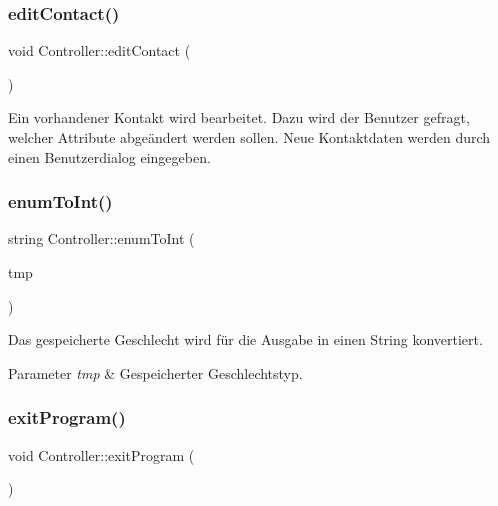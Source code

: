 \subsubsection{\texorpdfstring{edit\+Contact()}{editContact()}}
{\footnotesize\ttfamily void Controller\+::edit\+Contact (\begin{DoxyParamCaption}{ }\end{DoxyParamCaption})}



Ein vorhandener Kontakt wird bearbeitet. Dazu wird der Benutzer gefragt, welcher Attribute abgeändert werden sollen. Neue Kontaktdaten werden durch einen Benutzerdialog eingegeben.

\mbox{\label{classContactManager_1_1Controller_a6989880aa8c549f03067cb7d8d1be7a6}} 
\subsubsection{\texorpdfstring{enum\+To\+Int()}{enumToInt()}}
{\footnotesize\ttfamily string Controller\+::enum\+To\+Int (\begin{DoxyParamCaption}\item[{Gender\+Type}]{tmp }\end{DoxyParamCaption})\hspace{0.3cm}{\ttfamily [static]}}



Das gespeicherte Geschlecht wird für die Ausgabe in einen String konvertiert.


\begin{DoxyParams}{Parameter}
{\em tmp} & Gespeicherter Geschlechtstyp.\\
\hline
\end{DoxyParams}
\mbox{\label{classContactManager_1_1Controller_a923b6bc497d6f3f7c804a147743744f3}} 
\subsubsection{\texorpdfstring{exit\+Program()}{exitProgram()}}
{\footnotesize\ttfamily void Controller\+::exit\+Program (\begin{DoxyParamCaption}{ }\end{DoxyParamCaption})}



